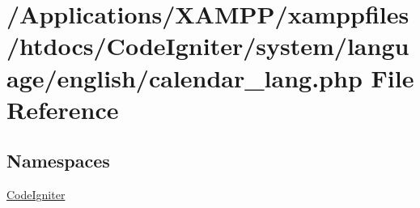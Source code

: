 \hypertarget{calendar__lang_8php}{}\section{/\+Applications/\+X\+A\+M\+P\+P/xamppfiles/htdocs/\+Code\+Igniter/system/language/english/calendar\+\_\+lang.php File Reference}
\label{calendar__lang_8php}
\subsection*{Namespaces}
\begin{DoxyCompactItemize}
\item 
 \mbox{\hyperlink{namespace_code_igniter}{Code\+Igniter}}
\end{DoxyCompactItemize}
